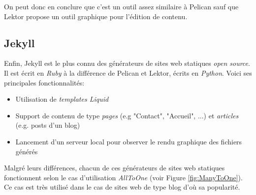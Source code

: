 	On peut donc en conclure que c'est un outil assez similaire à Pelican sauf que Lektor propose un outil graphique pour l'édition de contenu.
	
	\subsection*{Jekyll}
	Enfin, Jekyll \cite{Jekyll} est le plus connu des générateurs de sites web statiques \textit{open source}. Il est écrit en \textit{Ruby} à la différence de Pelican et Lektor, écrits en \textit{Python}. Voici ses principales fonctionnalités:
	
	\begin{itemize}
		\item Utilisation de \textit{templates Liquid}
		\item Support de contenu de type \textit{pages} (e.g "Contact", "Accueil", ...) et \textit{articles} (e.g. posts d'un blog)
		\item Lancement d'un serveur local pour observer le rendu graphique des fichiers générés\\
	\end{itemize}
	
	Malgré leurs différences, chacun de ces générateurs de sites web statiques fonctionnent selon le cas d'utilisation \textit{AllToOne} (voir Figure \ref{fig:ManyToOne}). Ce cas est très utilisé dans le cas de sites web de type blog d'où sa popularité.